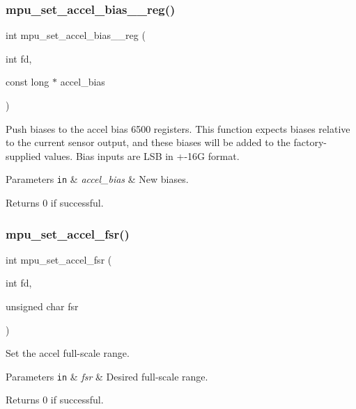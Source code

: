 \subsubsection{mpu\+\_\+set\+\_\+accel\+\_\+bias\+\_\+\_\+reg()}
{\footnotesize\ttfamily int mpu\+\_\+set\+\_\+accel\+\_\+bias\+\_\+\_\+reg (\begin{DoxyParamCaption}\item[{int}]{fd,  }\item[{const long $\ast$}]{accel\+\_\+bias }\end{DoxyParamCaption})}



Push biases to the accel bias 6500 registers. This function expects biases relative to the current sensor output, and these biases will be added to the factory-\/supplied values. Bias inputs are L\+SB in +-\/16G format. 


\begin{DoxyParams}[1]{Parameters}
\mbox{\tt in}  & {\em accel\+\_\+bias} & New biases. \\
\hline
\end{DoxyParams}
\begin{DoxyReturn}{Returns}
0 if successful. 
\end{DoxyReturn}
\mbox{\label{group___d_r_i_v_e_r_s_gaeb5685335b5ef1d752cc72df727a1848}} 
\subsubsection{mpu\+\_\+set\+\_\+accel\+\_\+fsr()}
{\footnotesize\ttfamily int mpu\+\_\+set\+\_\+accel\+\_\+fsr (\begin{DoxyParamCaption}\item[{int}]{fd,  }\item[{unsigned char}]{fsr }\end{DoxyParamCaption})}



Set the accel full-\/scale range. 


\begin{DoxyParams}[1]{Parameters}
\mbox{\tt in}  & {\em fsr} & Desired full-\/scale range. \\
\hline
\end{DoxyParams}
\begin{DoxyReturn}{Returns}
0 if successful. 
\end{DoxyReturn}
\mbox{\label{group___d_r_i_v_e_r_s_ga6ae2dd69cce50e9a2f852a18266a0718}} 
